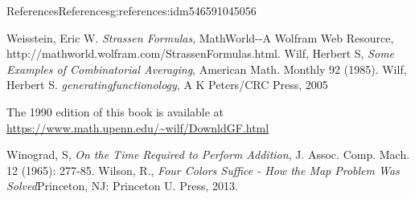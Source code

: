 \documentclass[oneside,10pt,]{book}
\newcommand{\xreffont}{\relax}
\numberwithin{equation}{section}
\begin{document}
\begin{references-chapter-numberless}{References}{}{References}{}{}{g:references:idm546591045056}
\begin{referencelist}
\hypertarget{x:biblio:biblio-weisstein-2010}{}Weisstein, Eric W. \textit{Strassen Formulas},  MathWorld-{}-{}A Wolfram Web Resource, http:\slash{}\slash{}mathworld.wolfram.com\slash{}StrassenFormulas.html.
\hypertarget{x:biblio:biblio-wilf-1985}{}Wilf, Herbert S, \textit{Some Examples of Combinatorial Averaging}, American Math. Monthly 92 (1985).
\hypertarget{x:biblio:biblio-wilf-1990}{}Wilf, Herbert S. \textit{generatingfunctionology}, A K Peters\slash{}CRC Press, 2005\par%
The 1990 edition of this book is available at \href{https://www.math.upenn.edu/\~wilf/DownldGF.html}{https:\slash{}\slash{}www.math.upenn.edu\slash{}\textasciitilde{}wilf\slash{}DownldGF.html}%

\hypertarget{x:biblio:biblio-winograd-1965}{}Winograd, S, \textit{On the Time Required to Perform Addition}, J. Assoc. Comp. Mach. 12 (1965): 277-85.
\hypertarget{x:biblio:biblio-wilson-2013}{}Wilson, R., \textit{Four Colors Suffice - How the Map Problem Was Solved}Princeton, NJ: Princeton U. Press, 2013.
\end{referencelist}
\end{references-chapter-numberless}
%
{\xreffont\printindex}
%
\end{document}
